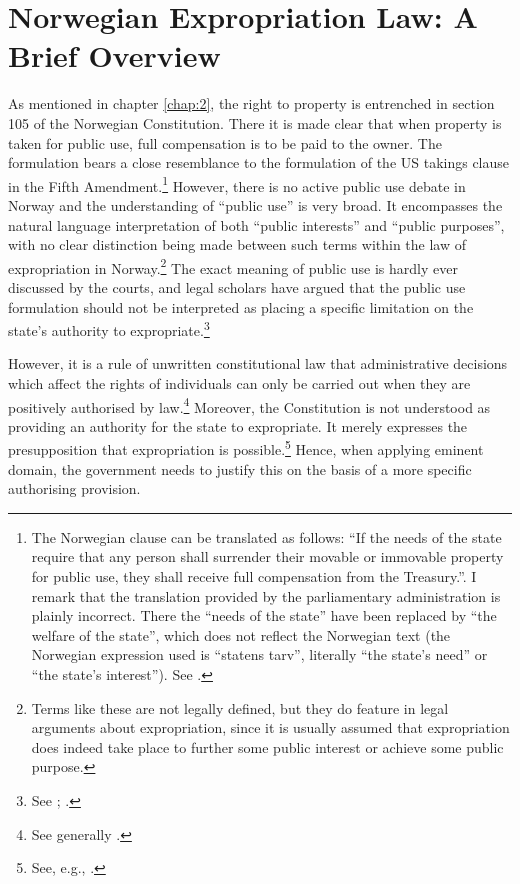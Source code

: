 \section{Norwegian Expropriation Law: A Brief Overview}\label{sec:5:2}

As mentioned in chapter \ref{chap:2}, the right to property is entrenched in section 105 of the Norwegian Constitution. There it is made clear that when property is taken for public use, full compensation is to be paid to the owner. The formulation bears a close resemblance to the formulation of the US takings clause in the Fifth Amendment.\footnote{The Norwegian clause can be translated as follows: ``If the needs of the state require that any person shall surrender their movable or immovable property for public use, they shall receive full compensation from the Treasury.''. I remark that the translation provided by the parliamentary administration is plainly incorrect. There the ``needs of the state'' have been replaced by ``the welfare of the state'', which does not reflect the Norwegian text (the Norwegian expression used is ``statens tarv'', literally ``the state's need'' or ``the state's interest''). See \cite{grunnlovsjuks}.} However, there is no active public use debate in Norway and the understanding of ``public use'' is very broad. It encompasses the natural language interpretation of both ``public interests'' and ``public purposes'', with no clear distinction being made between such terms within the law of expropriation in Norway.\footnote{Terms like these are not legally defined, but they do feature in legal arguments about expropriation, since it is usually assumed that expropriation does indeed take place to further some public interest or achieve some public purpose.} The exact meaning of public use is hardly ever discussed by the courts, and legal scholars have argued that the public use formulation should not be interpreted as placing a specific limitation on the state's authority to expropriate.\footnote{See \cite[249]{aall04}; \cite{sauda09}.}

However, it is a rule of unwritten constitutional law that administrative decisions which affect the rights of individuals can only be carried out when they are positively authorised by law.\footnote{See generally \cite{hogberg11}.} Moreover, the Constitution is not understood as providing an authority for the state to expropriate. It merely expresses the presupposition that expropriation is possible.\footnote{See, e.g., \cite[6]{fleischer86}.} Hence, when applying eminent domain, the government needs to justify this on the basis of a more specific authorising provision. 


